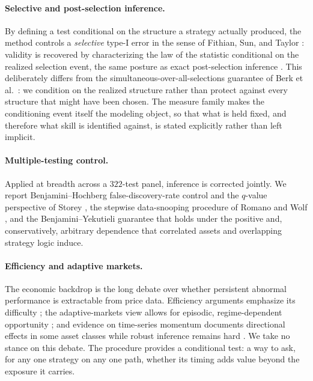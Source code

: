 \documentclass[risks,article,submit,pdftex,oneauthor]{Definitions/mdpi}
\begin{document}
\paragraph{Selective and post-selection inference.} By defining a test conditional on the
structure a strategy actually produced, the method controls a \emph{selective} type-I
error in the sense of Fithian, Sun, and Taylor \citep{FithianSunTaylor2014}: validity is
recovered by characterizing the law of the statistic conditional on the realized selection
event, the same posture as exact post-selection inference \citep{LeeSunSunTaylor2016}. This
deliberately differs from the simultaneous-over-all-selections guarantee of Berk et al.\
\citep{BerkBrownBujaZhangZhao2013}: we condition on the realized structure rather than
protect against every structure that might have been chosen. The measure family makes the
conditioning event itself the modeling object, so that what is held fixed, and therefore
what skill is identified against, is stated explicitly rather than left implicit.

\paragraph{Multiple-testing control.} Applied at breadth across a $322$-test panel,
inference is corrected jointly. We report Benjamini--Hochberg \citep{benjaminihochberg1995}
false-discovery-rate control and the $q$-value perspective of Storey \citep{Storey2002},
the stepwise data-snooping procedure of Romano and Wolf \citep{romanowolf2005}, and the
Benjamini--Yekutieli \citep{BenjaminiYekutieli2001} guarantee that holds under the positive
and, conservatively, arbitrary dependence that correlated assets and overlapping strategy
logic induce.

\paragraph{Efficiency and adaptive markets.} The economic backdrop is the long debate over
whether persistent abnormal performance is extractable from price data. Efficiency
arguments emphasize its difficulty \citep{fama1970}; the adaptive-markets view allows for
episodic, regime-dependent opportunity \citep{lo2004}; and evidence on time-series momentum
documents directional effects in some asset classes while robust inference remains hard
\citep{moskowitz2012}. We take no stance on this debate. The procedure provides a
conditional test: a way to ask, for any one strategy on any one path, whether its timing
adds value beyond the exposure it carries.
\end{document}
